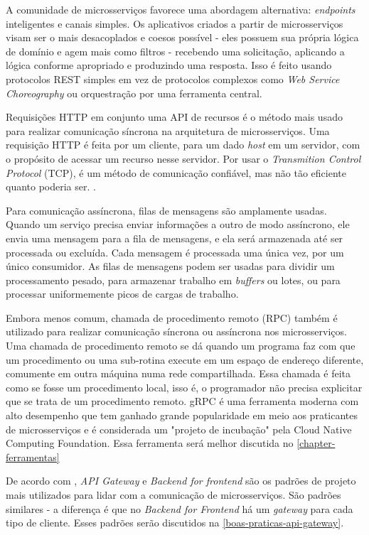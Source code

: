 A comunidade de microsserviços favorece uma abordagem alternativa: \emph{endpoints} inteligentes e canais simples. Os aplicativos criados a partir de microsserviços visam ser o mais desacoplados e coesos possível - eles possuem sua própria lógica de domínio e agem mais como filtros - recebendo uma solicitação, aplicando a lógica conforme apropriado e produzindo uma resposta. Isso é feito usando protocolos REST simples em vez de protocolos complexos como \emph{Web Service Choreography} ou orquestração por uma ferramenta central. \cite{MartinFowlerMicroservices}

Requisições HTTP em conjunto uma API de recursos é o método mais usado para realizar comunicação síncrona na arquitetura de microsserviços. Uma requisição HTTP é feita por um cliente, para um dado \emph{host} em um servidor, com o propósito de acessar um recurso nesse servidor. Por usar o \emph{Transmition Control Protocol} (TCP), é um método de comunicação confiável, mas não tão eficiente quanto poderia ser. \cite{MartinFowlerMicroservices}.

Para comunicação assíncrona, filas de mensagens são amplamente usadas. Quando um serviço precisa enviar informações a outro de modo assíncrono, ele envia uma mensagem para a fila de mensagens, e ela será armazenada até ser processada ou excluída. Cada mensagem é processada uma única vez, por um único consumidor. As filas de mensagens podem ser usadas para dividir um processamento pesado, para armazenar trabalho em \emph{buffers} ou lotes, ou para processar uniformemente picos de cargas de trabalho.

Embora menos comum, chamada de procedimento remoto (RPC) também é utilizado para realizar comunicação síncrona ou assíncrona nos microsserviços. Uma chamada de procedimento remoto se dá quando um programa faz com que um procedimento ou uma sub-rotina execute em um espaço de endereço diferente, comumente em outra máquina numa rede compartilhada. Essa chamada é feita como se fosse um procedimento local, isso é, o programador não precisa explicitar que se trata de um procedimento remoto. gRPC é uma ferramenta moderna com alto desempenho que tem ganhado grande popularidade em meio aos praticantes de microsserviços e é considerada um "projeto de incubação" pela Cloud Native Computing Foundation. Essa ferramenta será melhor discutida no \autoref{chapter-ferramentas} \cite{microsoft-grpc}

De acordo com , \emph{API Gateway} e \emph{Backend for frontend} são os padrões de projeto mais utilizados para lidar com a comunicação de microsserviços. São padrões similares - a diferença é que no \emph{Backend for Frontend} há um \emph{gateway} para cada tipo de cliente. Esses padrões serão discutidos na \autoref{boas-praticas-api-gateway}. 

